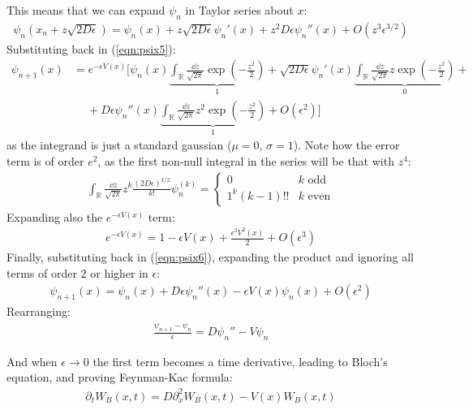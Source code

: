 \documentclass[../template.tex]{subfiles}
\begin{document}
This means that we can expand $\psi_n$ in Taylor series about $x$:
\begin{align*}
    \psi_n(x_n + z \sqrt{2 D \epsilon}) = \psi_n(x) + z \sqrt{2 D \epsilon} \psi_n'(x) + z^2 D \epsilon\psi_n''(x) + O(z^3 \epsilon^{3/2})  
\end{align*}
Substituting back in (\ref{eqn:psix5}):
\begin{align} \nonumber
    \psi_{n+1}(x) &= e^{-\epsilon V(x)} \Bigg[ \psi_n(x) \underbrace{\int_{\mathbb{R}} \frac{\dd{z}}{\sqrt{2 \pi}} \exp\left(-\frac{z^2}{2} \right)}_{1} + \sqrt{2 D \epsilon} \psi_n'(x) \underbrace{\int_{\mathbb{R}} \frac{\dd{z}}{\sqrt{2 \pi}} z\exp\left(-\frac{z^2}{2} \right)}_{0} + \\
    &\quad  \>
    + D \epsilon \psi_n''(x) \underbrace{\int_{\mathbb{R}} \frac{\dd{z}}{\sqrt{2 \pi}} z^2 \exp\left(-\frac{z^2}{2} \right)}_{1}
    + O(\epsilon^2) \Bigg] \label{eqn:psix6}
\end{align}
as the integrand is just a standard gaussian ($\mu= 0$, $\sigma = 1$). Note how the error term is of order $e^2$, as the first non-null integral in the series will be that with $z^4$:
\begin{align*}
    \int_{\mathbb{R}} \frac{\dd{z}}{\sqrt{2 \pi}} z^k \frac{({2 D \epsilon})^{k/2}}{k!} \psi_n^{(k)} = \begin{cases}
        0 & \text{$k$ odd}\\
        1^k (k-1)!! & \text{$k$ even}
    \end{cases} 
\end{align*}
Expanding also the $e^{-\epsilon V(x)}$ term:
\begin{align*}
    e^{-\epsilon V(x)} = 1 - \epsilon V(x) + \frac{\epsilon^2 V^2(x)}{2} + O(\epsilon^3) 
\end{align*}
Finally, substituting back in (\ref{eqn:psix6}), expanding the product and ignoring all terms of order $2$ or higher in $\epsilon$:
\begin{align*}
    \psi_{n+1}(x) = \psi_n(x) + D \epsilon \psi_n''(x) - \epsilon V(x) \psi_n(x) + O(\epsilon^2)
\end{align*}
Rearranging:
\begin{align*}
    \frac{\psi_{n+1} - \psi_n}{\epsilon} = D \psi_n'' - V \psi_n 
\end{align*}

And when $\epsilon \to 0$ the first term becomes a time derivative, leading to Bloch's equation, and proving Feynman-Kac formula:
\begin{align*}
    \partial_t W_B(x,t) = D \partial_x^2 W_B(x,t) - V(x) W_B(x,t)
\end{align*} 
\end{document}
